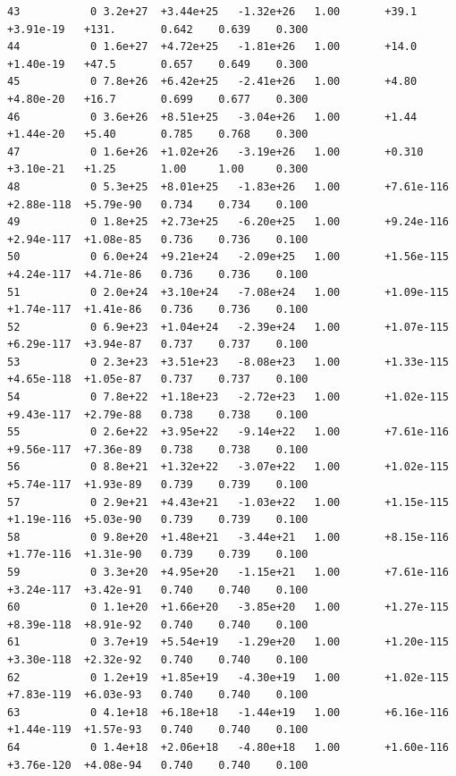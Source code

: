 \documentclass[12pt]{article}
\numberwithin{equation}{section}
\begin{document}
\begin{lstlisting}
43           0 3.2e+27  +3.44e+25   -1.32e+26   1.00       +39.1       +3.91e-19   +131.       0.642    0.639    0.300
44           0 1.6e+27  +4.72e+25   -1.81e+26   1.00       +14.0       +1.40e-19   +47.5       0.657    0.649    0.300
45           0 7.8e+26  +6.42e+25   -2.41e+26   1.00       +4.80       +4.80e-20   +16.7       0.699    0.677    0.300
46           0 3.6e+26  +8.51e+25   -3.04e+26   1.00       +1.44       +1.44e-20   +5.40       0.785    0.768    0.300
47           0 1.6e+26  +1.02e+26   -3.19e+26   1.00       +0.310      +3.10e-21   +1.25       1.00     1.00     0.300
48           0 5.3e+25  +8.01e+25   -1.83e+26   1.00       +7.61e-116  +2.88e-118  +5.79e-90   0.734    0.734    0.100
49           0 1.8e+25  +2.73e+25   -6.20e+25   1.00       +9.24e-116  +2.94e-117  +1.08e-85   0.736    0.736    0.100
50           0 6.0e+24  +9.21e+24   -2.09e+25   1.00       +1.56e-115  +4.24e-117  +4.71e-86   0.736    0.736    0.100
51           0 2.0e+24  +3.10e+24   -7.08e+24   1.00       +1.09e-115  +1.74e-117  +1.41e-86   0.736    0.736    0.100
52           0 6.9e+23  +1.04e+24   -2.39e+24   1.00       +1.07e-115  +6.29e-117  +3.94e-87   0.737    0.737    0.100
53           0 2.3e+23  +3.51e+23   -8.08e+23   1.00       +1.33e-115  +4.65e-118  +1.05e-87   0.737    0.737    0.100
54           0 7.8e+22  +1.18e+23   -2.72e+23   1.00       +1.02e-115  +9.43e-117  +2.79e-88   0.738    0.738    0.100
55           0 2.6e+22  +3.95e+22   -9.14e+22   1.00       +7.61e-116  +9.56e-117  +7.36e-89   0.738    0.738    0.100
56           0 8.8e+21  +1.32e+22   -3.07e+22   1.00       +1.02e-115  +5.74e-117  +1.93e-89   0.739    0.739    0.100
57           0 2.9e+21  +4.43e+21   -1.03e+22   1.00       +1.15e-115  +1.19e-116  +5.03e-90   0.739    0.739    0.100
58           0 9.8e+20  +1.48e+21   -3.44e+21   1.00       +8.15e-116  +1.77e-116  +1.31e-90   0.739    0.739    0.100
59           0 3.3e+20  +4.95e+20   -1.15e+21   1.00       +7.61e-116  +3.24e-117  +3.42e-91   0.740    0.740    0.100
60           0 1.1e+20  +1.66e+20   -3.85e+20   1.00       +1.27e-115  +8.39e-118  +8.91e-92   0.740    0.740    0.100
61           0 3.7e+19  +5.54e+19   -1.29e+20   1.00       +1.20e-115  +3.30e-118  +2.32e-92   0.740    0.740    0.100
62           0 1.2e+19  +1.85e+19   -4.30e+19   1.00       +1.02e-115  +7.83e-119  +6.03e-93   0.740    0.740    0.100
63           0 4.1e+18  +6.18e+18   -1.44e+19   1.00       +6.16e-116  +1.44e-119  +1.57e-93   0.740    0.740    0.100
64           0 1.4e+18  +2.06e+18   -4.80e+18   1.00       +1.60e-116  +3.76e-120  +4.08e-94   0.740    0.740    0.100

\end{lstlisting}
\end{document}
